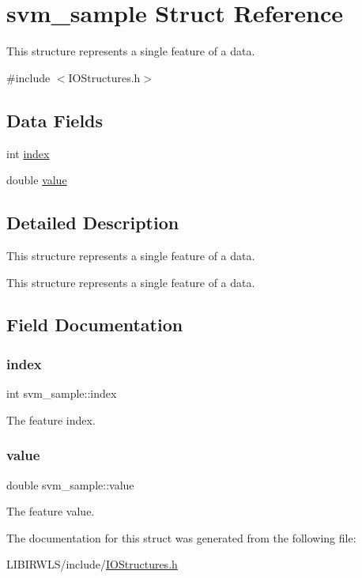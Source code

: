 \hypertarget{structsvm__sample}{}\section{svm\+\_\+sample Struct Reference}
\label{structsvm__sample}


This structure represents a single feature of a data.  




{\ttfamily \#include $<$I\+O\+Structures.\+h$>$}

\subsection*{Data Fields}
\begin{DoxyCompactItemize}
\item 
int \hyperlink{structsvm__sample_a008f6b24c7c76af103e84245fb271506}{index}
\item 
double \hyperlink{structsvm__sample_a2c43371736dc33a9e1d83561a99cf2f7}{value}
\end{DoxyCompactItemize}


\subsection{Detailed Description}
This structure represents a single feature of a data. 

This structure represents a single feature of a data. 

\subsection{Field Documentation}
\hypertarget{structsvm__sample_a008f6b24c7c76af103e84245fb271506}{}\label{structsvm__sample_a008f6b24c7c76af103e84245fb271506} 
\subsubsection{\texorpdfstring{index}{index}}
{\ttfamily int svm\+\_\+sample\+::index}

The feature index. \hypertarget{structsvm__sample_a2c43371736dc33a9e1d83561a99cf2f7}{}\label{structsvm__sample_a2c43371736dc33a9e1d83561a99cf2f7} 
\subsubsection{\texorpdfstring{value}{value}}
{\ttfamily double svm\+\_\+sample\+::value}

The feature value. 

The documentation for this struct was generated from the following file\+:\begin{DoxyCompactItemize}
\item 
L\+I\+B\+I\+R\+W\+L\+S/include/\hyperlink{IOStructures_8h}{I\+O\+Structures.\+h}\end{DoxyCompactItemize}
